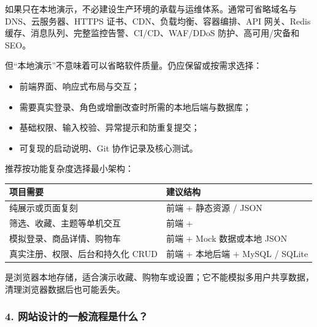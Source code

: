 \documentclass[UTF8,a4paper,11pt]{ctexart}
\begin{document}
\begin{gptmsg}

如果只在本地演示，不必建设生产环境的承载与运维体系。通常可省略域名与 DNS、云服务器、HTTPS 证书、CDN、负载均衡、容器编排、API 网关、Redis 缓存、消息队列、完整监控告警、CI/CD、WAF/DDoS 防护、高可用/灾备和 SEO。

但“本地演示”不意味着可以省略软件质量。仍应保留或按需求选择：

\begin{itemize}[leftmargin=1.7em]

\item 前端界面、响应式布局与交互；

\item 需要真实登录、角色或增删改查时所需的本地后端与数据库；

\item 基础权限、输入校验、异常提示和防重复提交；

\item 可复现的启动说明、Git 协作记录及核心测试。

\end{itemize}

推荐按功能复杂度选择最小架构：

\begin{center}
\setlength{\tabcolsep}{3pt}
\renewcommand{\arraystretch}{1.15}
\begin{tabularx}{\linewidth}{YY}
\toprule
\textbf{项目需要} & \textbf{建议结构} \\
\midrule
纯展示或页面复刻 & 前端 + 静态资源 / JSON \\
筛选、收藏、主题等单机交互 & 前端 + \texttt{} \\
模拟登录、商品详情、购物车 & 前端 + Mock 数据或本地 JSON \\
真实注册、权限、后台和持久化 CRUD & 前端 + 本地后端 + MySQL / SQLite \\
\bottomrule
\end{tabularx}
\end{center}

\texttt{} 是浏览器本地存储，适合演示收藏、购物车或设置；它不能模拟多用户共享数据，清理浏览器数据后也可能丢失。

\end{gptmsg}

\subsubsection*{4. 网站设计的一般流程是什么？}
\end{document}
